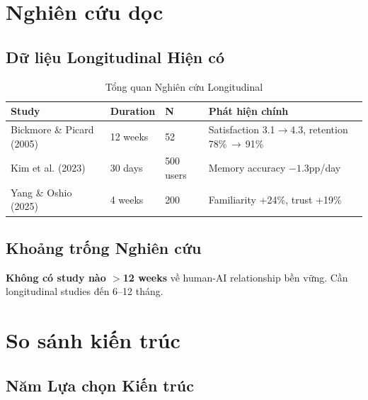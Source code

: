 \documentclass[10pt,leqno]{amsart}
\begin{document}

\section{Nghiên cứu dọc}

\subsection{Dữ liệu Longitudinal Hiện có}

\begin{table}[H]
\centering
\caption{Tổng quan Nghiên cứu Longitudinal}
\label{tab:longitudinal}
\begin{tabular}{llll}
\toprule
\textbf{Study} & \textbf{Duration} & \textbf{N} & \textbf{Phát hiện chính} \\
\midrule
Bickmore \& Picard (2005) & 12 weeks & 52 & Satisfaction 3.1$\to$4.3, retention 78\%\,$\to$\,91\% \\
Kim et al. (2023) & 30 days & 500 users & Memory accuracy $-1.3$pp/day \\
Yang \& Oshio (2025) & 4 weeks & 200 & Familiarity +24\%, trust +19\% \\
\bottomrule
\end{tabular}
\end{table}

\subsection{Khoảng trống Nghiên cứu}

\textbf{Không có study nào $>$12 weeks} về human-AI relationship bền vững. Cần longitudinal studies đến 6--12 tháng.


\section{So sánh kiến trúc}

\subsection{Năm Lựa chọn Kiến trúc}
\end{document}
